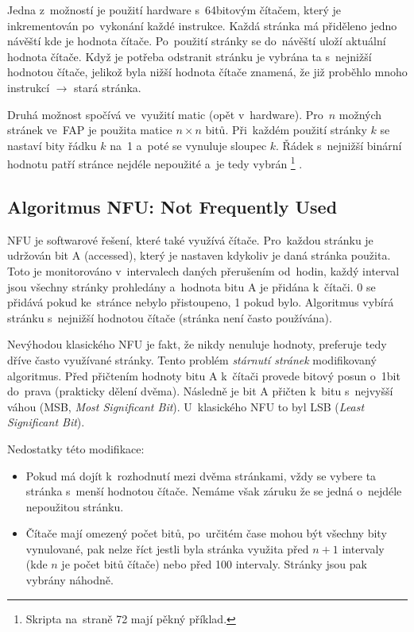 Jedna z~možností je použití hardware s~64bitovým čítačem, který je inkrementován po~vykonání každé instrukce. Každá stránka má přiděleno jedno návěští kde je hodnota čítače. Po~použití stránky se do~návěští uloží aktuální hodnota čítače. Když je potřeba odstranit stránku je vybrána ta s~nejnižší hodnotou čítače, jelikož byla nižší hodnota čítače znamená, že již proběhlo mnoho instrukcí $\rightarrow$ stará stránka.

\clearpage

Druhá možnost spočívá ve~využití matic (opět v~hardware). Pro~$n$ možných stránek ve~FAP je použita matice $n \times n$ bitů. Při~každém použití stránky $k$ se nastaví bity řádku $k$ na~1 a~poté se vynuluje sloupec $k$. Řádek s~nejnižší binární hodnotu patří stránce nejdéle nepoužité a~je tedy vybrán%
\footnote{Skripta na~straně 72 mají pěkný příklad.}%
.

\subsection{Algoritmus NFU: Not Frequently Used}

NFU je softwarové řešení, které také využívá čítače. Pro~každou stránku je udržován bit A (accessed), který je nastaven kdykoliv je daná stránka použita. Toto je monitorováno v~intervalech daných přerušením od~hodin, každý interval jsou všechny stránky prohledány a~hodnota bitu A je přidána k~čítači. 0 se přidává pokud ke~stránce nebylo přistoupeno, 1 pokud bylo. Algoritmus vybírá stránku s~nejnižší hodnotou čítače (stránka není často používána).

Nevýhodou klasického NFU je fakt, že nikdy nenuluje hodnoty, preferuje tedy dříve často využívané stránky. Tento problém \emph{stárnutí stránek} modifikovaný algoritmus. Před přičtením hodnoty bitu A k~čítači provede bitový posun o~1bit do~prava (prakticky dělení dvěma). Následně je bit A přičten k~bitu s~nejvyšší váhou (MSB, \emph{Most Significant Bit}). U~klasického NFU to byl LSB (\emph{Least Significant Bit}).

Nedostatky této modifikace:

\begin{itemize}[noitemsep]
	\item Pokud má dojít k~rozhodnutí mezi dvěma stránkami, vždy se vybere ta stránka s~menší hodnotou čítače. Nemáme však záruku že se jedná o~nejdéle nepoužitou stránku.
	\item Čítače mají omezený počet bitů, po~určitém čase mohou být všechny bity vynulované, pak nelze říct jestli byla stránka využita před $n+1$ intervaly (kde $n$ je počet bitů čítače) nebo před 100 intervaly. Stránky jsou pak vybrány náhodně.
\end{itemize}

